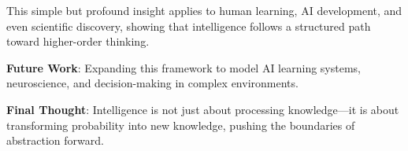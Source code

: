 \documentclass{article}
\newcommand{\no}{\noindent}
\newcommand{\bn}{\bigskip\noindent}
\begin{document}
\no
This simple but profound insight applies to human learning, AI development, and even scientific discovery, showing that intelligence follows a structured path toward higher-order thinking. 

\bn
{\bf Future Work}: Expanding this framework to model AI learning systems, neuroscience, and decision-making in complex environments.

\bn
{\bf Final Thought}: Intelligence is not just about processing knowledge---it is about transforming probability into new knowledge, pushing the boundaries of abstraction forward.
\end{document}

